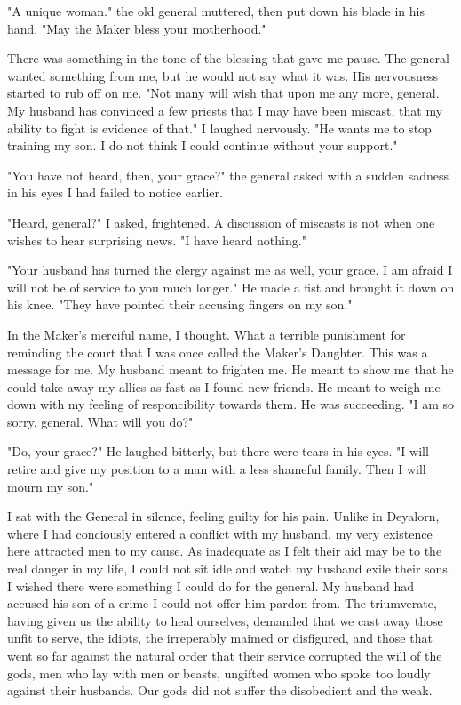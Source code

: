 \documentclass{article}
\begin{document}
"A unique woman." the old general muttered, then put down his blade in his hand. "May the Maker bless your motherhood."

There was something in the tone of the blessing that gave me pause. The general wanted something from me, but he would not say what it was. His nervousness started to rub off on me. "Not many will wish that upon me any more, general. My husband has convinced a few priests that I may have been miscast, that my ability to fight is evidence of that." I laughed nervously. "He wants me to stop training my son. I do not think I could continue without your support."

"You have not heard, then, your grace?" the general asked with a sudden sadness in his eyes I had failed to notice earlier.

"Heard, general?" I asked, frightened. A discussion of miscasts is not when one wishes to hear surprising news. "I have heard nothing."

"Your husband has turned the clergy against me as well, your grace. I am afraid I will not be of service to you much longer." He made a fist and brought it down on his knee. "They have pointed their accusing fingers on my son."

In the Maker's merciful name, I thought. What a terrible punishment for reminding the court that I was once called the Maker's Daughter. This was a message for me. My husband meant to frighten me. He meant to show me that he could take away my allies as fast as I found new friends. He meant to weigh me down with my feeling of responcibility towards them. He was succeeding. "I am so sorry, general. What will you do?"

"Do, your grace?" He laughed bitterly, but there were tears in his eyes. "I will retire and give my position to a man with a less shameful family. Then I will mourn my son." 

I sat with the General in silence, feeling guilty for his pain. Unlike in Deyalorn, where I had conciously entered a conflict with my husband, my very existence here attracted men to my cause. As inadequate as I felt their aid may be to the real danger in my life, I could not sit idle and watch my husband exile their sons. I wished there were something I could do for the general. My husband had accused his son of a crime I could not offer him pardon from. The triumverate, having given us the ability to heal ourselves, demanded that we cast away those unfit to serve, the idiots, the irreperably maimed or disfigured, and those that went so far against the natural order that their service corrupted the will of the gods, men who lay with men or beasts, ungifted women who spoke too loudly against their husbands. Our gods did not suffer the disobedient and the weak. 
\end{document}
